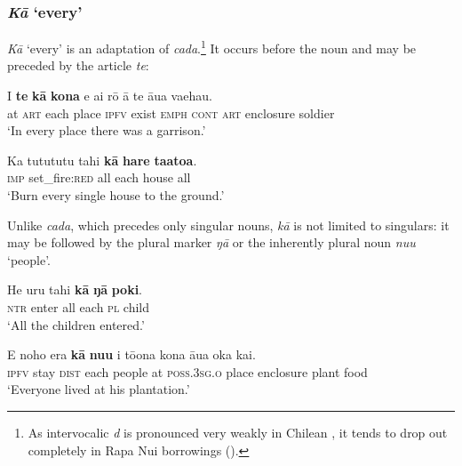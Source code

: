 \subsubsection{\textit{Kā} ‘every’}\label{sec:4.4.8.2}
\textit{Kā} ‘every’ is an adaptation of  \textit{cada}.\footnote{\label{fn:188}As intervocalic \textit{d} is pronounced very weakly in Chilean , it tends to drop out completely in Rapa Nui borrowings ().} It occurs before the noun and may be preceded by the article \textit{te}:

\ea\label{ex:4.110}
\gll {\ꞌ}I \textbf{te} \textbf{kā} \textbf{kona} e ai rō {\ꞌ}ā te {\ꞌ}āua va{\ꞌ}ehau. \\
at \textsc{art} each place \textsc{ipfv} exist \textsc{emph} \textsc{cont} \textsc{art} enclosure soldier \\

\glt 
‘In every place there was a garrison.’ \textstyleExampleref{[Notes]}
\z

\ea\label{ex:4.111}
\gll Ka tutututu tahi \textbf{kā} \textbf{hare} \textbf{ta{\ꞌ}ato{\ꞌ}a}. \\
\textsc{imp} set\_fire:\textsc{red} all each house all \\

\glt 
‘Burn every single house to the ground.’ \textstyleExampleref{[R368.059]} 
\z

Unlike  \textit{cada}, which precedes only singular nouns, \textit{kā} is not limited to singulars: it may be followed by the plural marker \textit{ŋā} or the inherently plural noun \textit{nu{\ꞌ}u} ‘people’.

\ea\label{ex:4.112}
\gll He uru tahi \textbf{kā} \textbf{ŋā} \textbf{poki}. \\
\textsc{ntr} enter all each \textsc{pl} child \\

\glt 
‘All the children entered.’ \textstyleExampleref{[R151.016]} 
\z

\ea\label{ex:4.113}
\gll E noho era \textbf{kā} \textbf{nu{\ꞌ}u} {\ꞌ}i tō{\ꞌ}ona kona {\ꞌ}āua {\ꞌ}oka kai. \\
\textsc{ipfv} stay \textsc{dist} each people at \textsc{poss.3sg.o} place enclosure plant food \\

\glt 
‘Everyone lived at his plantation.’ \textstyleExampleref{[R107.038]} 
\z

